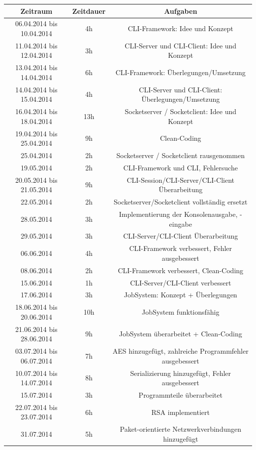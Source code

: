 \documentclass[12pt,a4paper]{report}
\begin{document}
\begin{onehalfspace}
\begin{center}
\begin{tabular}{c|c|c}
\textbf{Zeitraum} & \textbf{Zeitdauer} & \textbf{Aufgaben} \\ \hline
06.04.2014 bis 10.04.2014 & 4h & CLI-Framework: Idee und Konzept\\
11.04.2014 bis 12.04.2014 & 3h & CLI-Server und CLI-Client: Idee und Konzept\\
13.04.2014 bis 14.04.2014 & 6h & CLI-Framework: Überlegungen/Umsetzung\\
14.04.2014 bis 15.04.2014 & 4h & CLI-Server und CLI-Client: Überlegungen/Umsetzung\\
16.04.2014 bis 18.04.2014 & 13h & Socketserver / Socketclient: Idee und Konzept\\
19.04.2014 bis 25.04.2014 & 9h & Clean-Coding\\
25.04.2014 & 2h & Socketserver / Socketclient rausgenommen\\
19.05.2014 & 2h & CLI-Framework und CLI, Fehlersuche\\
20.05.2014 bis 21.05.2014 & 9h & CLI-Session/CLI-Server/CLI-Client Überarbeitung\\
22.05.2014 & 2h & Socketserver/Socketclient vollständig ersetzt\\
28.05.2014 & 3h & Implementierung der Konsolenausgabe, -eingabe\\
29.05.2014 & 3h & CLI-Server/CLI-Client Überarbeitung\\
06.06.2014 & 4h & CLI-Framework verbessert, Fehler ausgebessert\\
08.06.2014 & 2h & CLI-Framework verbessert, Clean-Coding\\
15.06.2014 & 1h & CLI-Server/CLI-Client verbessert\\
17.06.2014 & 3h & JobSystem: Konzept + Überlegungen\\
18.06.2014 bis 20.06.2014 & 10h & JobSystem funktionsfähig\\
21.06.2014 bis 28.06.2014 & 9h & JobSystem überarbeitet + Clean-Coding\\
03.07.2014 bis 06.07.2014 & 7h & AES hinzugefügt, zahlreiche Programmfehler ausgebessert\\
10.07.2014 bis 14.07.2014 & 8h & Serializierung hinzugefügt, Fehler ausgebessert\\
15.07.2014 & 3h & Programmteile überarbeitet\\
22.07.2014 bis 23.07.2014 & 6h & RSA implementiert\\
31.07.2014 & 5h & Paket-orientierte Netzwerkverbindungen hinzugefügt\\ \hline
  

\end{tabular}
\end{center}
\end{onehalfspace}
\end{document}
